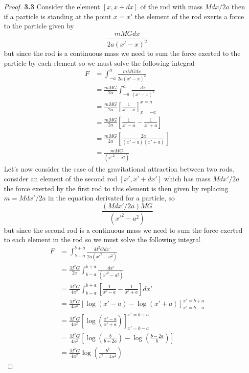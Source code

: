 \documentclass[11pt]{article}
\begin{document}
	\begin{proof}{\textbf{3.3}}
        Consider the element $[x,x+dx]$ of the rod with mass $Mdx/2a$ then if a
        particle is standing at the point $x=x'$ the element of the rod exerts a
        force to the particle given by
        $$\frac{mMGdx}{2a(x'-x)^2}$$
        but since the rod is a continuous mass we need to sum the force exerted
        to the particle by each element so we must solve the following integral
        \begin{align*}
            F &= \int_{-a}^{a} \frac{mMGdx}{2a(x'-x)^2} \\
              &= \frac{mMG}{2a} \int_{-a}^{a} \frac{dx}{(x'-x)^2} \\
              &= \frac{mMG}{2a} \left[ \frac{1}{x'- x} \right]^{x=a}_{x=-a} \\
              &= \frac{mMG}{2a} \left[ \frac{1}{x'- a} - \frac{1}{x'+ a} \right] \\
              &= \frac{mMG}{2a} \left[ \frac{2a}{(x'- a)(x'+ a)} \right] \\
              &= \frac{mMG}{(x'^2 - a^2)}
        \end{align*}
        Let's now consider the case of the gravitational attraction between two
        rods, consider an element of the second rod $[x', x'+dx']$ which has
        mass $Mdx'/2a$ the force exerted by the first rod to this element is
        then given by replacing $m=Mdx'/2a$ in the equation derivated for a
        particle, so
        $$\frac{(Mdx'/2a)MG}{(x'^2 - a^2)}$$
        but since the second rod is a continuous mass we need to sum the force
        exerted to each element in the rod so we must solve the following
        integral
        \begin{align*}
            F &= \int_{b-a}^{b+a} \frac{M^2Gdx'}{2a(x'^2 - a^2)} \\
              &= \frac{M^2G}{2a} \int_{b-a}^{b+a} \frac{dx'}{(x'^2 - a^2)} \\
              &= \frac{M^2G}{4a^2} \int_{b-a}^{b+a} \left[ \frac{1}{x'- a} - \frac{1}{x'+ a} \right] dx'\\
              &= \frac{M^2G}{4a^2} \left[ \log(x'-a) - \log(x' + a)\right]^{x'=b+a}_{x'=b-a} \\
              &= \frac{M^2G}{4a^2} \left[ \log\left( \frac{x'-a}{x'+a} \right) \right]^{x'=b+a}_{x'=b-a} \\
              &= \frac{M^2G}{4a^2} \left[ \log\left( \frac{b}{b+2a} \right) - \log\left( \frac{b - 2a}{b} \right) \right] \\
              &= \frac{M^2G}{4a^2} \log \left( \frac{b^2}{b^2 - 4a^2} \right) \
        \end{align*}
    \end{proof}
\end{document}
